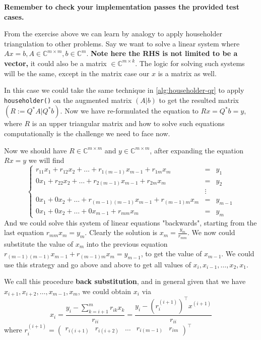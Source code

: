 \noindent \textbf{Remember to check your implementation passes the provided test cases.} \newpage

\noindent From the exercise above we can learn by analogy to apply householder triangulation to other problems. Say we want to solve a linear system where \(Ax = b, A \in  \mathbb{C}^{m \times  m}, b \in \mathbb{C}^{m}\). \textbf{Note here the RHS is not limited to be a vector,} it could also be a matrix \(\in \mathbb{C}^{m \times k}\). The logic for solving such systems will be the same, except in the matrix case our $x$ is a matrix as well. \medskip

\noindent In this case we could take the same technique in \autoref{alg:householder-qr} to apply \texttt{householder()} on the augmented matrix $(A | b)$ to get the resulted matrix $(R := Q^{*}A | Q^{*}b)$. Now we have re-formulated the equation to $Rx = Q^{*}b = y$, where $R$ is an upper triangular matrix and how to solve such equations computationally is the challenge we need to face now. \medskip

\noindent Now we should have \(R \in \mathbb{C}^{m \times m}\) and \(y \in \mathbb{C}^{m \times  m}\), after expanding the equation $Rx = y$ we will find
\[
\left\{
  \begin{array}{rcl}
    r_{11}x_1 + r_{12}x_2 + \ldots + r_{1(m - 1)}x_{m - 1} + r_{1m}x_{m} & = & y_1 \\
    0x_1 + r_{22}x_2 + \ldots + r_{2(m - 1)}x_{m - 1} + r_{2m}x_m & = & y_2 \\
     & \vdots &  \\
    0x_1 + 0x_2 + \ldots + r_{(m - 1)(m - 1)}x_{m - 1} + r_{(m - 1)m}x_{m} & = & y_{m - 1} \\
    0x_1 + 0x_2 + \ldots + 0x_{m - 1} + r_{mm}x_{m} & = & y_{m}
  \end{array}
\right.
\]
And we could solve this system of linear equations "backwards", starting from the last equation $r_{mm}x_{m} = y_{m}$. Clearly the solution is $x_{m} = \frac{y_{m}}{r_{mm}}$. We now could substitute the value of $x_{m}$ into the previous equation $r_{(m - 1)(m - 1)}x_{m - 1} + r_{(m - 1)m}x_{m} = y_{m - 1}$, to get the value of $x_{m - 1}$. We could use this strategy and go above and above to get all values of $x_{i}, x_{i - 1}, \ldots, x_{2}, x_1$. \medskip

\noindent We call this procedure \textbf{back substitution}, and in general given that we have $x_{i + 1}, x_{i + 2}, \ldots, x_{m - 1}, x_{m}$, we could obtain $x_{i}$ via
\[
x_{i} = \frac{y_{i} - \sum_{k=i + 1}^{m} r_{ik}x_{k}}{r_{ii}} = \frac{y_{i} - (r_{i}^{(i + 1)})^{\top} x^{(i + 1)}}{r_{ii}}
\] 
where $r_{i}^{(i + 1)} = \begin{pmatrix} r_{i(i + 1)} & r_{i(i + 2)} & \ldots & r_{i(m - 1)} & r_{im} \end{pmatrix} ^{\top}$ 

